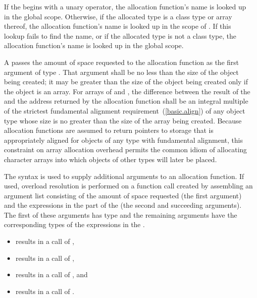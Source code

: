 \pnum
{}%
If the  begins with a unary \tcode{::}
operator, the allocation function's name is looked up in the global
scope. Otherwise, if the allocated type is a class type  or
array thereof, the allocation function's name is looked up in the scope
of . If this lookup fails to find the name, or if the allocated
type is not a class type, the allocation function's name is looked up in
the global scope.

\pnum
A  passes the amount of space requested to the
allocation function as the first argument of type
. That argument shall be no less than the size
of the object being created; it may be greater than the size of the
object being created only if the object is an array. For arrays of
 and , the difference between the
result of the  and the address returned by the
allocation function shall be an integral multiple of the
strictest fundamental
alignment requirement~(\ref{basic.align}) of any object type whose size
is no greater than the size of the array being created.
\enternote 
{}%
Because allocation functions are assumed to return pointers to storage
that is appropriately aligned for objects of any type
with fundamental alignment, this constraint
on array allocation overhead permits the common idiom of allocating
character arrays into which objects of other types will later be placed.
\exitnote 

\pnum
{}%
The  syntax is used to supply additional
arguments to an allocation function. If used, overload resolution is
performed on a function call created by assembling an argument list
consisting of the amount of space requested (the first argument) and the
expressions in the  part of the
 (the second and succeeding arguments). The
first of these arguments has type  and the remaining
arguments have the corresponding types of the expressions in the
.

\pnum
\enterexample 

\begin{itemize}
\item {} results in a call of ,

\item {} results in a call of ,

\item {} results in a call of , and

\item {} results in a call of .
\end{itemize}

